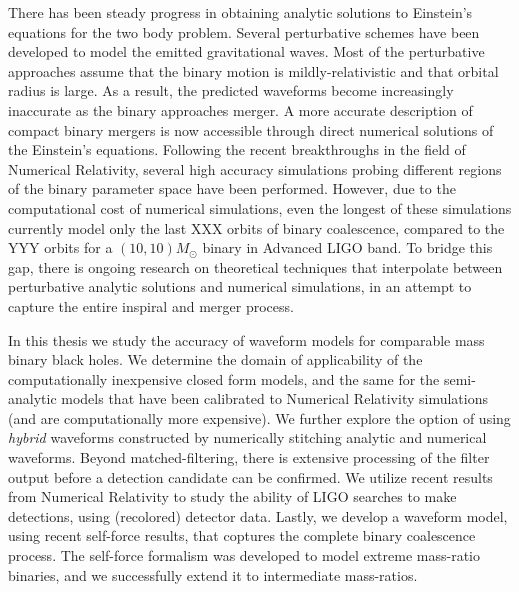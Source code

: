 There has been steady progress in obtaining analytic solutions to Einstein's
equations for the two body problem. Several perturbative schemes have been 
developed to model the emitted gravitational waves. Most of
the perturbative approaches assume that the binary motion is 
mildly-relativistic and that orbital radius is large. As a result, the predicted 
waveforms become increasingly inaccurate as the binary approaches merger. 
A more accurate description of compact binary mergers is now accessible
through direct numerical solutions of the Einstein's equations.
Following the recent breakthroughs in the field of Numerical Relativity, 
several high accuracy simulations probing different regions of the binary 
parameter space have been performed. 
However, due to the computational cost of numerical simulations, even the 
longest of these simulations currently model only the last XXX orbits
of binary coalescence, compared to the YYY orbits for a $(10,10) M_\odot$
binary in Advanced LIGO band. To bridge this gap, there is ongoing
research on theoretical techniques that interpolate between  
perturbative analytic solutions and numerical simulations, in an attempt to 
capture the entire inspiral and merger process.

In this thesis we study the accuracy of waveform models for comparable mass
binary black holes.
We determine the domain of applicability of the computationally inexpensive closed 
form models, and the same for the semi-analytic models that have been calibrated
to Numerical Relativity simulations (and are computationally more expensive).
We further explore the option of 
using {\it hybrid} waveforms constructed by numerically stitching 
analytic and numerical waveforms. Beyond matched-filtering, there 
is extensive processing of the filter output before a detection candidate can
be confirmed. We utilize recent results from Numerical Relativity to study
the ability of LIGO searches to make detections, using (recolored) detector data.
Lastly, we develop a waveform model, using recent self-force results, that 
coptures the complete binary coalescence process. The self-force formalism was
developed to model extreme mass-ratio binaries, and we successfully extend it 
to intermediate mass-ratios.
